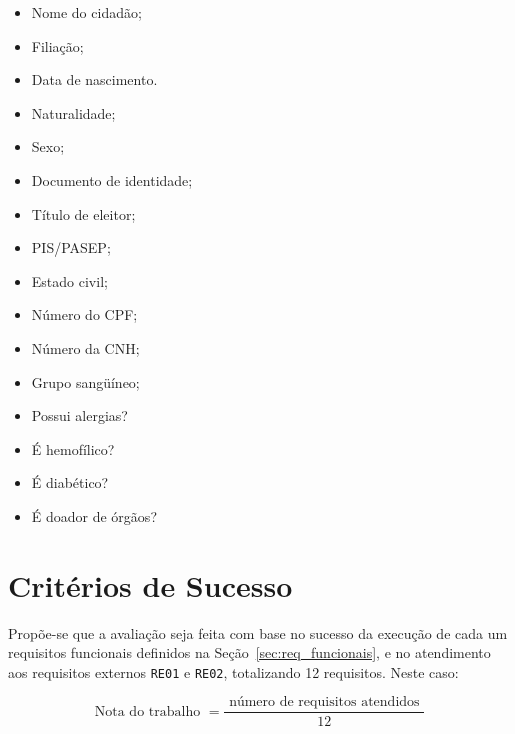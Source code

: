 \documentclass[a4paper,10pt]{article}
\begin{document}
\begin{itemize}
  \begin{multicols}{3}
    \begin{itemize}
      \item Nome do cidadão;
      \item Filiação;
      \item Data de nascimento.
      \item Naturalidade;
      \item Sexo;
      \item Documento de identidade;
      \item Título de eleitor;
      \item PIS/PASEP;
      \item Estado civil;
      \item Número do CPF;
      \item Número da CNH;
      \item Grupo sangüíneo;
      \item Possui alergias?
      \item É hemofílico?
      \item É diabético?
      \item É doador de órgãos?
    \end{itemize}
  \end{multicols}
\end{itemize}

\section{Critérios de Sucesso}

Propõe-se que a avaliação seja feita com base no sucesso da execução de cada um requisitos funcionais definidos na Seção~\ref{sec:req_funcionais}, e no atendimento aos requisitos externos \texttt{RE01} e \texttt{RE02}, totalizando 12 requisitos. Neste caso:

\[ \text{Nota do trabalho } = \frac{\text{ número de requisitos atendidos }}{12} \]
\end{document}
